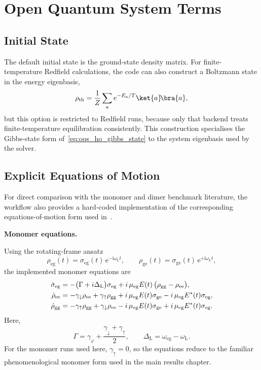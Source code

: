 \section{Open Quantum System Terms}
\label{app:sec:oqs_evolution}

\subsection{Initial State}

The default initial state is the ground-state density matrix. For
finite-temperature Redfield calculations, the code can also construct a
Boltzmann state in the energy eigenbasis,
\[
\rho_{\mathrm{th}}
=
\frac{1}{Z}\sum_{a} e^{-E_a/T}\ket{a}\!\bra{a},
\]
but this option is restricted to Redfield runs, because only that backend
treats finite-temperature equilibration consistently. This construction
specialises the Gibbs-state form of~\autoref{eq:oqs_ho_gibbs_state} to the
system eigenbasis used by the solver.

\subsection{Explicit Equations of Motion}
\label{app:sec:paper_eqs_explicit_eoms}

For direct comparison with the monomer and dimer benchmark literature, the
workflow also provides a hard-coded implementation of the corresponding
equations-of-motion form used
in~\cite{mancaletal2006twodimensionalopticalthreepulse,pisliakovetal2006twodimensionalopticalthreepulse}.

\noindent\textbf{Monomer equations.}

Using the rotating-frame ansatz
\[
\rho_{\mathrm{eg}}(t)=\sigma_{\mathrm{eg}}(t)\,\mathrm{e}^{-\mathrm{i}\omega_{\mathrm{L}} t},
\qquad
\rho_{\mathrm{ge}}(t)=\sigma_{\mathrm{ge}}(t)\,\mathrm{e}^{+\mathrm{i}\omega_{\mathrm{L}} t},
\]
the implemented monomer equations are
\begin{align}
\dot{\sigma}_{\mathrm{eg}}
&=
-\bigl(\Gamma + i\Delta_{\mathrm{L}}\bigr)\sigma_{\mathrm{eg}}
+ i\,\mu_{\mathrm{eg}} E(t)\,\bigl(\rho_{\mathrm{gg}}-\rho_{\mathrm{ee}}\bigr),
\label{eq:app_monomer_eom_sigma_eg}
\\
\dot{\rho}_{\mathrm{ee}}
&=
-\gamma_{\downarrow}\rho_{\mathrm{ee}}
+ \gamma_{\uparrow}\rho_{\mathrm{gg}}
+ i\,\mu_{\mathrm{eg}}E(t)\sigma_{\mathrm{ge}}
- i\,\mu_{\mathrm{eg}}E^{*}(t)\sigma_{\mathrm{eg}},
\notag
\\
\dot{\rho}_{\mathrm{gg}}
&=
-\gamma_{\uparrow}\rho_{\mathrm{gg}}
+ \gamma_{\downarrow}\rho_{\mathrm{ee}}
- i\,\mu_{\mathrm{eg}}E(t)\sigma_{\mathrm{ge}}
+ i\,\mu_{\mathrm{eg}}E^{*}(t)\sigma_{\mathrm{eg}}.
\label{eq:app_monomer_eom_rho_gg}
\end{align}
Here,
\[
\Gamma
=
\gamma_{\varphi}+\frac{\gamma_{\downarrow}+\gamma_{\uparrow}}{2},
\qquad
\Delta_{\mathrm{L}}
=
\omega_{\mathrm{eg}}-\omega_{\mathrm{L}}.
\]
For the monomer runs used here, \(\gamma_{\uparrow}=0\), so the equations
reduce to the familiar phenomenological monomer form used in the main results
chapter.

